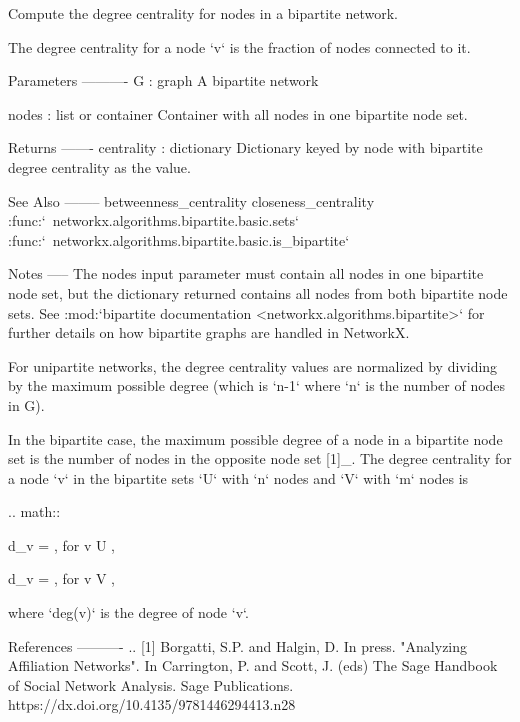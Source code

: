 \begin{DoxyVerb}Compute the degree centrality for nodes in a bipartite network.

The degree centrality for a node `v` is the fraction of nodes
connected to it.

Parameters
----------
G : graph
   A bipartite network

nodes : list or container
  Container with all nodes in one bipartite node set.

Returns
-------
centrality : dictionary
   Dictionary keyed by node with bipartite degree centrality as the value.

See Also
--------
betweenness_centrality
closeness_centrality
:func:`~networkx.algorithms.bipartite.basic.sets`
:func:`~networkx.algorithms.bipartite.basic.is_bipartite`

Notes
-----
The nodes input parameter must contain all nodes in one bipartite node set,
but the dictionary returned contains all nodes from both bipartite node
sets. See :mod:`bipartite documentation <networkx.algorithms.bipartite>`
for further details on how bipartite graphs are handled in NetworkX.

For unipartite networks, the degree centrality values are
normalized by dividing by the maximum possible degree (which is
`n-1` where `n` is the number of nodes in G).

In the bipartite case, the maximum possible degree of a node in a
bipartite node set is the number of nodes in the opposite node set
[1]_.  The degree centrality for a node `v` in the bipartite
sets `U` with `n` nodes and `V` with `m` nodes is

.. math::

    d_{v} = , \mbox{for} v \in U ,

    d_{v} = , \mbox{for} v \in V ,


where `deg(v)` is the degree of node `v`.

References
----------
.. [1] Borgatti, S.P. and Halgin, D. In press. "Analyzing Affiliation
    Networks". In Carrington, P. and Scott, J. (eds) The Sage Handbook
    of Social Network Analysis. Sage Publications.
    https://dx.doi.org/10.4135/9781446294413.n28
\end{DoxyVerb}
 